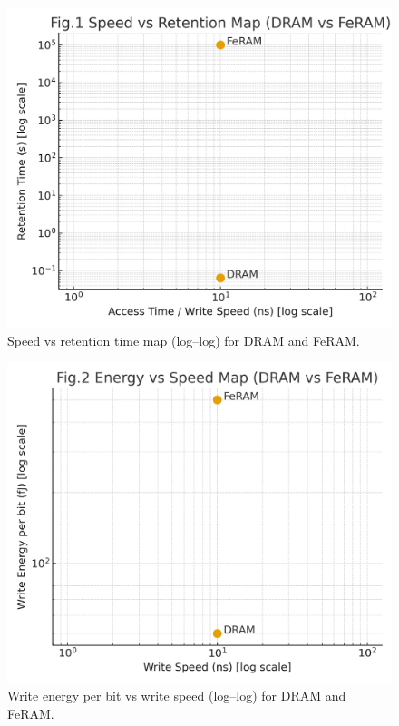 \documentclass[journal]{IEEEtran}
\begin{document}
\begin{figure}[!t]
\centering
\includegraphics[width=\linewidth]{fig1_speed_vs_retention.png}
\caption{Speed vs retention time map (log--log) for DRAM and FeRAM.}
\label{fig:svr}
\end{figure}

\begin{figure}[!t]
\centering
\includegraphics[width=\linewidth]{fig2_energy_vs_speed.png}
\caption{Write energy per bit vs write speed (log--log) for DRAM and FeRAM.}
\label{fig:evs}
\end{figure}
\end{document}
